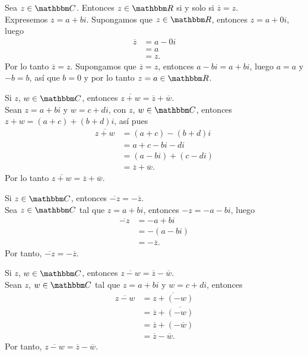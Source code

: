 \begin{proposition}\label{conjugado-real}
    Sea $z \in \CC$. Entonces $z \in \RR$ si y solo si $\overline{z}=z$. \\
    \demostracion Expresemos $z=a+bi$. Supongamos que $z \in \RR$, entonces $z=a+0i$, luego
    \begin{align*}
        \overline{z} &=a-0i \\
        & = a \\
        & = z.
    \end{align*}
    Por lo tanto $\overline{z}=z$. Supongamos que $\overline{z}=z$, entonces $a-bi=a+bi$, luego $a=a$ y $-b=b$, así que $b=0$ y por lo tanto $z=a \in \RR$.
\end{proposition}

\begin{proposition}
    Si $z$, $w \in \CC$, entonces $\overline{z+w}=\overline{z} +\overline{w}$. \\
    \demostracion Sean $z=a+bi$ y $w=c+di$, con $z$, $w \in \CC$, entonces $z+w=(a+c)+(b+d)i$, así pues
    \begin{align*}
        \overline{z+w} & =(a+c)-(b+d)i \\
        &=a+c-bi-di \\
        &=(a-bi)+(c-di) \\
        &=\overline{z} + \overline{w}.
    \end{align*}
    Por lo tanto $\overline{z+w}=\overline{z} + \overline{w}$.
\end{proposition}

\begin{proposition}
    Si $z \in \CC$, entonces $\overline{-z}=- \overline{z}$. \\
    \demostracion Sea $z \in \CC$ tal que $z=a+bi$, entonces $-z=-a-bi$, luego
    \begin{align*}
        \overline{-z} &=-a+bi \\
        & =-(a-bi) \\
        & =- \overline{z}.
    \end{align*}
    Por tanto, $\overline{-z}=- \overline{z}$.
\end{proposition}

\begin{proposition}
    Si $z$, $w \in \CC$, entonces $\overline{z-w}=\overline{z} - \overline{w}$. \\
    \demostracion Sean $z$, $w \in \CC$ tal que $z=a+bi$ y $w=c+di$, entonces
    \begin{align*}
        \overline{z-w} &=\overline{z+(-w)} \\
        &=\overline{z} + \overline{(-w)} \\
        &=\overline{z} + (- \overline{w}) \\
        &=\overline{z} - \overline{w}.
    \end{align*}
    Por tanto, $\overline{z-w}=\overline{z} - \overline{w}$.
\end{proposition}

